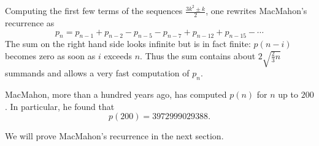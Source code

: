 
Computing the first few terms of the sequences $\frac{3k^2 \pm k}2$, one rewrites MacMahon's recurrence as
\[
p_n = p_{n-1} + p_{n-2} - p_{n-5} - p_{n-7} + p_{n-12} + p_{n-15} - \cdots
\]
The sum on the right hand side looks infinite but is in fact finite: $p(n-i)$ becomes zero as soon as $i$ exceeds $n$.
Thus the sum contains about $2\sqrt{\frac{2}{3} n}$ summands and allows a very fast computation of $p_n$.

MacMahon, more than a hundred years ago, has computed $p(n)$ for $n$ up to $200$.
In particular, he found that
\[
p(200) = 3 972 999 029 388.
\]

We will prove MacMahon's recurrence in the next section.


